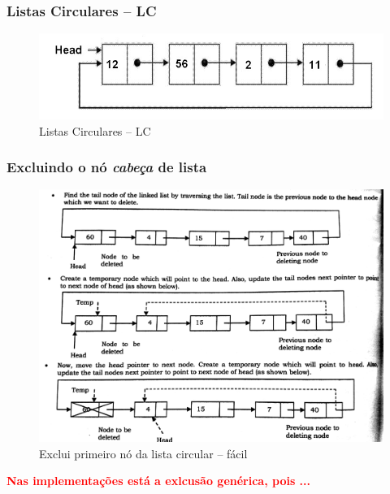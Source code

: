 
\begin{frame}%

\frametitle{Listas Circulares -- LC}

\begin{figure}[!hb]
	\centering
\includegraphics[height=0.30\paperheight, width=0.9\paperwidth]
{figs/fig_listas/lista_circular.jpg}						
			\caption{Listas Circulares -- LC}	
		\end{figure} 

\end{frame} 
\begin{frame}%

\frametitle{Excluindo o nó \textit{cabeça} de lista}

\begin{figure}[!hb]
	\centering
	\includegraphics[height=0.650\paperheight, width=0.67\paperwidth]
	{figs/fig_listas/exclui_prim_no_lista_circular}						
			\caption{Exclui primeiro nó  da lista circular -- fácil}	
			
		\end{figure} 

\textbf{
\textcolor{red}{Nas implementações está a exlcusão genérica, pois ...}
}
\end{frame} 



